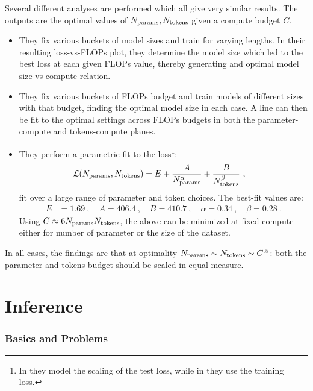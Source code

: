 \documentclass[11pt]{article}
\begin{document}
Several different analyses are performed which all give very similar results. The outputs are the optimal values of $ N _{ {\rm params} }, N _{ {\rm tokens} } $ given a compute budget $ C $.
\begin{itemize}
\item They fix various buckets of model sizes and train for varying lengths. In their resulting
    loss-vs-FLOPs plot, they determine the model size which led to the best loss at each given FLOPs value, thereby generating
    and optimal model size vs compute relation.
\item They fix various buckets of FLOPs budget and train models of different sizes with that budget,
    finding the optimal model size in each case. A line can then be fit to the optimal settings across
    FLOPs budgets in both the parameter-compute and tokens-compute planes.
\item  They perform a parametric fit to the loss\footnote{In \cite{hoffmann2022training} they model
the scaling of the test loss, while in \cite{kaplan2020scaling} they use the training loss.}:
\begin{align}
    \mathcal{L} (N _{ {\rm params} }, N _{ {\rm tokens} }) &=E + \frac{ A }{ N _{ {\rm  params} } ^{ \alpha  } }  + \frac{ B }{ N _{ {\rm tokens} } ^{ \beta  } } \label{eq_chinchilla} \ ,
\end{align}
fit over a large range of parameter and token choices. The best-fit values are:
\begin{align}
    E &= 1.69 \ , \quad A = 406.4 \ , \quad B = 410.7 \ , \quad  \alpha = 0.34 \ , \quad \beta =0.28 \ .
\end{align}
Using $ C \approx 6 N _{ {\rm params}} N _{ {\rm tokens} } $, the above can be minimized at fixed compute
either for number of parameter or the size of the dataset.
\end{itemize}
In all cases, the findings are that at optimality  $ N _{ {\rm params} }  \sim N _{ {\rm tokens}
}\sim C ^{ .5 } $: both the parameter and tokens budget should be scaled in equal measure.







\part{Inference}


\section{Basics and Problems}
\end{document}
